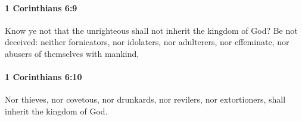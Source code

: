 		\paragraph{1 Corinthians 6:9} %
			\label{1CORINTHIANS-6-9}

			Know ye not that the unrighteous shall not inherit the kingdom of God? Be not deceived: neither fornicators, nor idolaters, nor adulterers, nor effeminate, nor abusers of themselves with mankind,

			\begin{framed}
			\scriptsize
				\begin{compactdesc}
					\item[SBLG] 
				\end{compactdesc}
			\end{framed}

		\paragraph{1 Corinthians 6:10} %
			\label{1CORINTHIANS-6-10}

			Nor thieves, nor covetous, nor drunkards, nor revilers, nor extortioners, shall inherit the kingdom of God.

